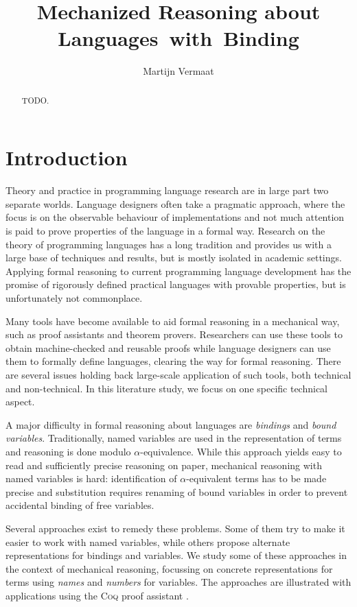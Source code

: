 \documentclass[a4paper,11pt]{article}
\title{Mechanized Reasoning about Languages~with~Binding}
\author{Martijn Vermaat}
\date{}
\newcommand{\name}[1]{\textsc{#1}\xspace}
\def\Coq{\name{Coq}}
\begin{document}
\maketitle


\begin{abstract}
  TODO.
\end{abstract}


\section{Introduction}\label{sec:introduction}

Theory and practice in programming language research are in large part
two separate worlds.
Language designers often take a pragmatic approach, where the focus is
on the observable behaviour of implementations and not much attention
is paid to prove properties of the language in a formal way.
Research on the theory of programming languages has a long tradition and
provides us with a large base of techniques and results, but is mostly
isolated in academic settings.
Applying formal reasoning to current programming language development
has the promise of rigorously defined practical languages with provable
properties, but is unfortunately not commonplace.

Many tools have become available to aid formal reasoning in a mechanical
way, such as proof assistants and theorem provers.
Researchers can use these tools to obtain machine-checked and reusable
proofs while language designers can use them to formally define languages,
clearing the way for formal reasoning.
There are several issues holding back large-scale application of such
tools, both technical and non-technical. In this literature study, we
focus on one specific technical aspect.

A major difficulty in formal reasoning about languages are {\em bindings}
and {\em bound variables}.
Traditionally, named variables are used in the representation of terms
and reasoning is done modulo $\alpha$-equivalence.
While this approach yields easy to read and sufficiently precise
reasoning on paper,
mechanical reasoning with named variables is hard:
identification of $\alpha$-equivalent terms has to be made precise and
substitution requires renaming of bound variables in order to prevent
accidental binding of free variables.

Several approaches exist to remedy these problems.
Some of them try to make it easier to work with named variables, while
others propose alternate representations for bindings and variables.
We study some of these approaches in the context of mechanical
reasoning, focussing on concrete representations for terms using
{\em names} and {\em numbers} for variables.
The approaches are illustrated with applications using the \Coq proof
assistant \cite{coq-refman-09,bertot-casteran-04}.
\end{document}
